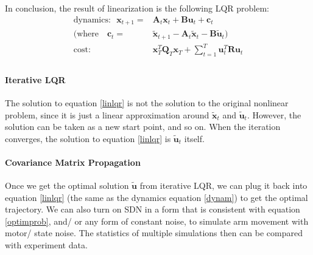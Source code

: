 In conclusion, the result of linearization is the following LQR problem:
\begin{equation}\label{linlqr}
\begin{split}
\text{dynamics:~~}\bm{x}_{t+1} =& \bm{A}_t \bm{x}_t + \bm{B}\bm{u}_t + \bm{c}_t \\
(\text{where~~~}\bm{c}_t = & \tilde{\bm{x}}_{t+1} - \bm{A}_t\tilde{\bm{x}}_{t} - \bm{B}\tilde{\bm{u}}_t) \\
\text{cost:~~~~~~~~~~~} & \bm{x}_T^T\bm{Q}_T\bm{x}_T + \sum_{t=1}^T\bm{u}_t^T\bm{Ru}_t \\
\end{split}
\end{equation}

\paragraph{Iterative LQR}
The solution to equation \ref{linlqr} is not the solution to the original nonlinear problem, since it is just a linear approximation around $\tilde{\bm{x}}_t$ and $\tilde{\bm{u}}_t$. However, the solution can be taken as a new start point, and so on. When the iteration converges, the solution to equation \ref{linlqr} is $\tilde{\bm{u}}_t$ itself.

\paragraph{Covariance Matrix Propagation}\label{app:covarProp}
Once we get the optimal solution $\tilde{\bm{u}}$ from iterative LQR, we can plug it back into equation \ref{linlqr} (the same as the dynamics equation \ref{dynam}) to get the optimal trajectory. We can also turn on SDN in a form that is consistent with equation \ref{optimprob}, and/ or any form of constant noise, to simulate arm movement with motor/ state noise. The statistics of multiple simulations then can be compared with experiment data.

